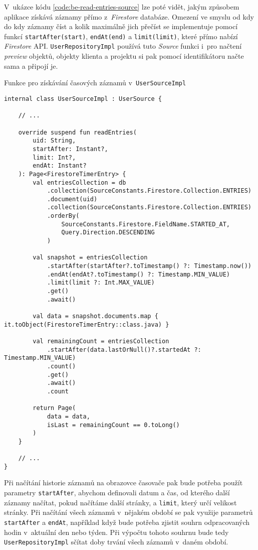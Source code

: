 V~ukázce kódu \ref{code:be-read-entries-source} lze poté vidět, jakým způsobem aplikace získává záznamy přímo z~\emph{Firestore} databáze. Omezení ve smyslu od kdy do kdy záznamy číst a kolik maximálně jich přečíst se implementuje pomocí funkcí \texttt{startAfter(start)}, \texttt{endAt(end)} a \texttt{limit(limit)}, které přímo nabízí \emph{Firestore} API. \texttt{UserRepositoryImpl} používá tuto \emph{Source} funkci i~pro načtení \emph{preview} objektů, objekty klienta a projektu si pak pomocí identifikátoru načte sama a připojí je.

\begin{listing}
\caption{Funkce pro získávání časových záznamů v~\texttt{UserSourceImpl}}\label{code:be-read-entries-source}
\begin{verbatim}
internal class UserSourceImpl : UserSource {

    // ...
    
    override suspend fun readEntries(
        uid: String,
        startAfter: Instant?,
        limit: Int?,
        endAt: Instant?
    ): Page<FirestoreTimerEntry> {
        val entriesCollection = db
            .collection(SourceConstants.Firestore.Collection.ENTRIES)
            .document(uid)
            .collection(SourceConstants.Firestore.Collection.ENTRIES)
            .orderBy(
                SourceConstants.Firestore.FieldName.STARTED_AT, 
                Query.Direction.DESCENDING
            )

        val snapshot = entriesCollection
            .startAfter(startAfter?.toTimestamp() ?: Timestamp.now())
            .endAt(endAt?.toTimestamp() ?: Timestamp.MIN_VALUE)
            .limit(limit ?: Int.MAX_VALUE)
            .get()
            .await()

        val data = snapshot.documents.map { it.toObject(FirestoreTimerEntry::class.java) }

        val remainingCount = entriesCollection
            .startAfter(data.lastOrNull()?.startedAt ?: Timestamp.MIN_VALUE)
            .count()
            .get()
            .await()
            .count

        return Page(
            data = data,
            isLast = remainingCount == 0.toLong()
        )
    }
    
    // ...
}
\end{verbatim}
\end{listing}

Při načítání historie záznamů na obrazovce časovače pak bude potřeba použít parametry \texttt{startAfter}, abychom definovali datum a čas, od kterého další záznamy načítat, pokud načítáme další stránky, a \texttt{limit}, který určí velikost stránky. Při načítání všech záznamů v~nějakém období se pak využije parametrů \texttt{startAfter} a \texttt{endAt}, například když bude potřeba zjistit souhrn odpracovaných hodin v~aktuální den nebo týden. Při výpočtu tohoto souhrnu bude tedy \texttt{UserRepositoryImpl} sčítat doby trvání všech záznamů v~daném období.

